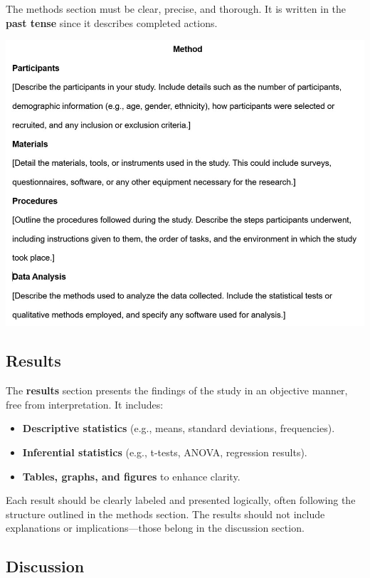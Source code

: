 \documentclass[
]{book}
\providecommand{\tightlist}{%
  \setlength{\itemsep}{0pt}\setlength{\parskip}{0pt}}
\begin{document}
The methods section must be clear, precise, and thorough. It is written in the \textbf{past tense} since it describes completed actions.

\includegraphics[width=1\linewidth,height=\textheight,keepaspectratio]{images/fig083.jpg}

\subsection*{Results}\label{results}

The \textbf{results} section presents the findings of the study in an objective manner, free from interpretation. It includes:

\begin{itemize}
\tightlist
\item
  \textbf{Descriptive statistics} (e.g., means, standard deviations, frequencies).
\item
  \textbf{Inferential statistics} (e.g., t-tests, ANOVA, regression results).
\item
  \textbf{Tables, graphs, and figures} to enhance clarity.
\end{itemize}

Each result should be clearly labeled and presented logically, often following the structure outlined in the methods section. The results should not include explanations or implications---those belong in the discussion section.

\subsection*{Discussion}\label{discussion}
\end{document}
